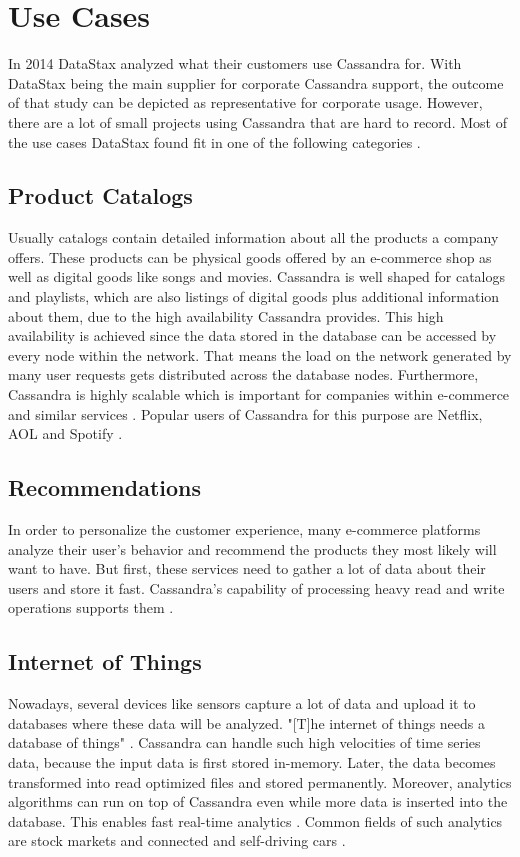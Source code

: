 \clearpage
\section{Use Cases}
In 2014 DataStax analyzed what their customers use Cassandra for. With DataStax being the main supplier for corporate Cassandra support, the outcome of that study can be depicted as representative for corporate usage. However, there are a lot of small projects using Cassandra that are hard to record. Most of the use cases DataStax found fit in one of the following categories \cite{useCases}.

\subsection{Product Catalogs}
Usually catalogs contain detailed information about all the products a company offers. These products can be physical goods offered by an e-commerce shop as well as digital goods like songs and movies. Cassandra is well shaped for catalogs and playlists, which are also listings of digital goods plus additional information about them, due to the high availability Cassandra provides. This high availability is achieved since the data stored in the database can be accessed by every node within the network. That means the load on the network generated by many user requests gets distributed across the database nodes. Furthermore, Cassandra is highly scalable which is important for companies within e-commerce and similar services \cite{useCases} \cite{useCases2}. Popular users of Cassandra for this purpose are Netflix, AOL and Spotify \cite{useCases}.

\subsection{Recommendations}
In order to personalize the customer experience, many e-commerce platforms analyze their user's behavior and recommend the products they most likely will want to have. But first, these services need to gather a lot of data about their users and store it fast. Cassandra's capability of processing heavy read and write operations supports them \cite{useCases} \cite{useCases2}.

\subsection{Internet of Things}
Nowadays, several devices like sensors capture a lot of data and upload it to databases where these data will be analyzed. "[T]he internet of things needs a \grq database of things\grq " \cite{useCases}. Cassandra can handle such high velocities of time series data, because the input data is first stored in-memory. Later, the data becomes transformed into read optimized files and stored permanently. Moreover, analytics algorithms can run on top of Cassandra even while more data is inserted into the database. This enables fast real-time analytics \cite{useCases}. Common fields of such analytics are stock markets and connected and self-driving cars \cite{useCases} \cite{useCases2}.

